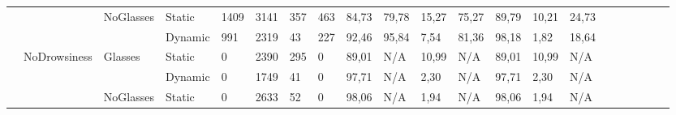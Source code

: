 \documentclass[12pt]{article}
\begin{document}
\begin{landscape}
\begin{table}[]
\begin{adjustbox}{width=1.4\textwidth}
\begin{tabular}{lllllllllllllllccllll}
				\multicolumn{1}{|l|}{} & \multicolumn{1}{l|}{} & \multicolumn{1}{l|}{\multirow{2}{*}{NoGlasses}} & \multicolumn{1}{l|}{Static}  & \multicolumn{1}{l|}{1409} & \multicolumn{1}{l|}{3141} & \multicolumn{1}{l|}{357} & \multicolumn{1}{l|}{463} & \multicolumn{1}{l|}{84,73} & \multicolumn{1}{l|}{79,78} & \multicolumn{1}{l|}{15,27} & \multicolumn{1}{l|}{75,27} & \multicolumn{1}{l|}{89,79} & \multicolumn{1}{l|}{10,21} & \multicolumn{1}{l|}{24,73} & \multicolumn{1}{c|}{} & \multicolumn{1}{c|}{} & \multicolumn{1}{l|}{} & \multicolumn{1}{l|}{} & \multicolumn{1}{l|}{} & \multicolumn{1}{l|}{}\\ \cline{4-15}
				\multicolumn{1}{|l|}{} & \multicolumn{1}{l|}{} & \multicolumn{1}{l|}{} & \multicolumn{1}{l|}{Dynamic} & \multicolumn{1}{l|}{991} & \multicolumn{1}{l|}{2319} & \multicolumn{1}{l|}{43} & \multicolumn{1}{l|}{227} & \multicolumn{1}{l|}{92,46} & \multicolumn{1}{l|}{95,84} & \multicolumn{1}{l|}{7,54} & \multicolumn{1}{l|}{81,36} & \multicolumn{1}{l|}{98,18} & \multicolumn{1}{l|}{1,82} & \multicolumn{1}{l|}{18,64} & \multicolumn{1}{c|}{} & \multicolumn{1}{c|}{} & \multicolumn{1}{l|}{} & \multicolumn{1}{l|}{} & \multicolumn{1}{l|}{} & \multicolumn{1}{l|}{} \\ \cline{2-15}
				\multicolumn{1}{|l|}{} & \multicolumn{1}{l|}{\multirow{4}{*}{NoDrowsiness}} & \multicolumn{1}{l|}{\multirow{2}{*}{Glasses}} & \multicolumn{1}{l|}{Static} & \multicolumn{1}{l|}{0} & \multicolumn{1}{l|}{2390} & \multicolumn{1}{l|}{295} & \multicolumn{1}{l|}{0} & \multicolumn{1}{l|}{89,01} & \multicolumn{1}{l|}{N/A} & \multicolumn{1}{l|}{10,99} & \multicolumn{1}{l|}{N/A} & \multicolumn{1}{l|}{89,01} & \multicolumn{1}{l|}{10,99} & \multicolumn{1}{l|}{N/A} & \multicolumn{1}{c|}{} & \multicolumn{1}{c|}{} & \multicolumn{1}{l|}{} & \multicolumn{1}{l|}{} & \multicolumn{1}{l|}{} & \multicolumn{1}{l|}{}\\ \cline{4-15}
				\multicolumn{1}{|l|}{} & \multicolumn{1}{l|}{} & \multicolumn{1}{l|}{} & \multicolumn{1}{l|}{Dynamic} & \multicolumn{1}{l|}{0} & \multicolumn{1}{l|}{1749} & \multicolumn{1}{l|}{41} & \multicolumn{1}{l|}{0} & \multicolumn{1}{l|}{97,71} & \multicolumn{1}{l|}{N/A} & \multicolumn{1}{l|}{2,30} & \multicolumn{1}{l|}{N/A} & \multicolumn{1}{l|}{97,71} & \multicolumn{1}{l|}{2,30} & \multicolumn{1}{l|}{N/A} & \multicolumn{1}{c|}{} & \multicolumn{1}{c|}{} & \multicolumn{1}{l|}{} & \multicolumn{1}{l|}{} & \multicolumn{1}{l|}{} & \multicolumn{1}{l|}{}\\ \cline{3-15}
				\multicolumn{1}{|l|}{} & \multicolumn{1}{l|}{} & \multicolumn{1}{l|}{\multirow{2}{*}{NoGlasses}} & \multicolumn{1}{l|}{Static} & \multicolumn{1}{l|}{0} & \multicolumn{1}{l|}{2633} & \multicolumn{1}{l|}{52} & \multicolumn{1}{l|}{0} & \multicolumn{1}{l|}{98,06} & \multicolumn{1}{l|}{N/A} & \multicolumn{1}{l|}{1,94} & \multicolumn{1}{l|}{N/A} & \multicolumn{1}{l|}{98,06} & \multicolumn{1}{l|}{1,94} & \multicolumn{1}{l|}{N/A} & \multicolumn{1}{c|}{} & \multicolumn{1}{c|}{} & \multicolumn{1}{l|}{} & \multicolumn{1}{l|}{} & \multicolumn{1}{l|}{} & \multicolumn{1}{l|}{} \\ \cline{4-15}

\end{tabular}
\end{adjustbox}
\end{table}
\end{landscape}
\end{document}
